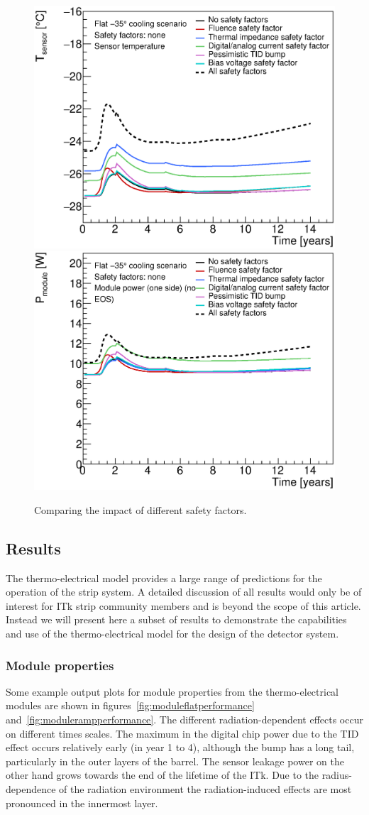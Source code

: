 \begin{figure}[ht]
\centering
\includegraphics[width=0.49\linewidth]{figures/CompareSafetyFactors_SensorTemperature_R3.eps}
\includegraphics[width=0.49\linewidth]{figures/CompareSafetyFactors_ModulePower_R3.eps}
\caption{Comparing the impact of different safety factors.}
\label{fig:safety_factors}
\end{figure}

\subsection{Results}
The thermo-electrical model provides a large range of predictions for the operation of the strip system. A detailed discussion of all results would only be of interest for ITk strip community members and is beyond the scope of this article. Instead we will present here a subset of results to demonstrate the capabilities and use of the thermo-electrical model for the design of the detector system.

\subsubsection{Module properties}

Some example output plots for module properties from the thermo-electrical modules are shown in figures~\ref{fig:moduleflatperformance} and~\ref{fig:modulerampperformance}. The different radiation-dependent effects occur on different times scales. The maximum in the digital chip power due to the TID effect occurs relatively early (in year 1 to 4), although the bump has a long tail, particularly in the outer layers of the barrel. The sensor leakage power on the other hand grows towards the end of the lifetime of the ITk. Due to the radius-dependence of the radiation environment the radiation-induced effects are most pronounced in the innermost layer.

